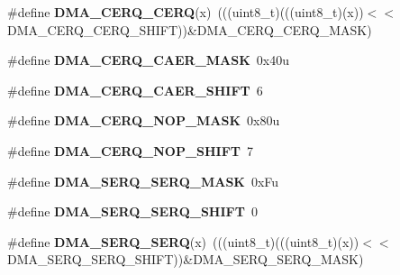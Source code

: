 \begin{DoxyCompactItemize}
\item 
\#define {\bfseries D\+M\+A\+\_\+\+C\+E\+R\+Q\+\_\+\+C\+E\+RQ}(x)~(((uint8\+\_\+t)(((uint8\+\_\+t)(x))$<$$<$D\+M\+A\+\_\+\+C\+E\+R\+Q\+\_\+\+C\+E\+R\+Q\+\_\+\+S\+H\+I\+FT))\&D\+M\+A\+\_\+\+C\+E\+R\+Q\+\_\+\+C\+E\+R\+Q\+\_\+\+M\+A\+SK)\hypertarget{group__DMA__Register__Masks_ga06bccf8bb52efa7918d7ba7648d30aa0}{}\label{group__DMA__Register__Masks_ga06bccf8bb52efa7918d7ba7648d30aa0}

\item 
\#define {\bfseries D\+M\+A\+\_\+\+C\+E\+R\+Q\+\_\+\+C\+A\+E\+R\+\_\+\+M\+A\+SK}~0x40u\hypertarget{group__DMA__Register__Masks_ga17f24999dd91f4ddc8f10ec2927da85b}{}\label{group__DMA__Register__Masks_ga17f24999dd91f4ddc8f10ec2927da85b}

\item 
\#define {\bfseries D\+M\+A\+\_\+\+C\+E\+R\+Q\+\_\+\+C\+A\+E\+R\+\_\+\+S\+H\+I\+FT}~6\hypertarget{group__DMA__Register__Masks_ga8a6482d87d17b4fec19e2fd984323f54}{}\label{group__DMA__Register__Masks_ga8a6482d87d17b4fec19e2fd984323f54}

\item 
\#define {\bfseries D\+M\+A\+\_\+\+C\+E\+R\+Q\+\_\+\+N\+O\+P\+\_\+\+M\+A\+SK}~0x80u\hypertarget{group__DMA__Register__Masks_gae8c0c81a0c9cfc2e2bd4aaa42ee5b204}{}\label{group__DMA__Register__Masks_gae8c0c81a0c9cfc2e2bd4aaa42ee5b204}

\item 
\#define {\bfseries D\+M\+A\+\_\+\+C\+E\+R\+Q\+\_\+\+N\+O\+P\+\_\+\+S\+H\+I\+FT}~7\hypertarget{group__DMA__Register__Masks_ga68bc3b3f8e1fe22186c0e92e73a93c64}{}\label{group__DMA__Register__Masks_ga68bc3b3f8e1fe22186c0e92e73a93c64}

\item 
\#define {\bfseries D\+M\+A\+\_\+\+S\+E\+R\+Q\+\_\+\+S\+E\+R\+Q\+\_\+\+M\+A\+SK}~0x\+Fu\hypertarget{group__DMA__Register__Masks_ga42b17276b88c86b34cabdbf64e4686c2}{}\label{group__DMA__Register__Masks_ga42b17276b88c86b34cabdbf64e4686c2}

\item 
\#define {\bfseries D\+M\+A\+\_\+\+S\+E\+R\+Q\+\_\+\+S\+E\+R\+Q\+\_\+\+S\+H\+I\+FT}~0\hypertarget{group__DMA__Register__Masks_ga41f7ac5f6e15267810208ea0146bdcad}{}\label{group__DMA__Register__Masks_ga41f7ac5f6e15267810208ea0146bdcad}

\item 
\#define {\bfseries D\+M\+A\+\_\+\+S\+E\+R\+Q\+\_\+\+S\+E\+RQ}(x)~(((uint8\+\_\+t)(((uint8\+\_\+t)(x))$<$$<$D\+M\+A\+\_\+\+S\+E\+R\+Q\+\_\+\+S\+E\+R\+Q\+\_\+\+S\+H\+I\+FT))\&D\+M\+A\+\_\+\+S\+E\+R\+Q\+\_\+\+S\+E\+R\+Q\+\_\+\+M\+A\+SK)\hypertarget{group__DMA__Register__Masks_ga0b5a7acb359bcc57dd725102edfd21f9}{}\label{group__DMA__Register__Masks_ga0b5a7acb359bcc57dd725102edfd21f9}


\end{DoxyCompactItemize}
